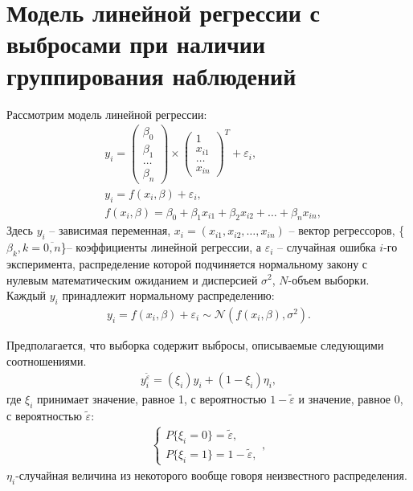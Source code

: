 \section{Модель линейной регрессии с выбросами при наличии группирования наблюдений}
Рассмотрим модель линейной регрессии:
\begin{eqnarray}
    &\label{eq2}y_i= 
    \begin{pmatrix}
        \beta_0\\
        \beta_1\\
        \dots\\
        \beta_n
    \end{pmatrix}\times
    \begin{pmatrix}
        1\\
        x_{i1}\\
        \dots\\
        x_{in}
    \end{pmatrix}^{T}+ \varepsilon_i,\\
    &y_i= f(x_i,\beta)+\varepsilon_i,\\
    &f(x_i,\beta)=\beta_0+\beta_1 x_{i1}+\beta_2 x_{i2}+\dots+\beta_n x_{in},
\end{eqnarray}
Здесь $y_i$ -- зависимая переменная, $x_i=(x_{i1},x_{i2},\dots,x_{in})$ -- вектор регрессоров, \{$\beta_k, k=\overline{0,n}$\}-- коэффициенты линейной регрессии, а $\varepsilon_i$ -- случайная ошибка $i$-го эксперимента, распределение которой подчиняется нормальному закону с нулевым математическим ожиданием и дисперсией $\sigma^2$, $N$-объем выборки.
Каждый $y_i$ принадлежит нормальному распределению:
\begin{eqnarray}
    \label{eq12} y_i=f(x_i,\beta)+\varepsilon_i \sim \mathcal{N}(f(x_i,\beta),\sigma^2).
\end{eqnarray}

Предполагается, что выборка содержит выбросы, описываемые следующими соотношениями.
\begin{eqnarray}
    \label{eq3}y_i^{\widetilde{\varepsilon}}=(\xi_i)y_i+ (1-\xi_i)\eta_i,
\end{eqnarray}
где $\xi_i$ принимает значение, равное 1, с вероятностью $1-\widetilde{\varepsilon}$ и значение, равное 0, с вероятностью $\widetilde{\varepsilon}$:
\begin{eqnarray}\label{eq4}
    \begin{cases}
        P\{\xi_i=0\}=\widetilde{\varepsilon},\\
        P\{\xi_i=1\}=1-\widetilde{\varepsilon},
    \end{cases},
\end{eqnarray}
$\eta_i$-случайная величина из некоторого вообще говоря неизвестного распределения.

